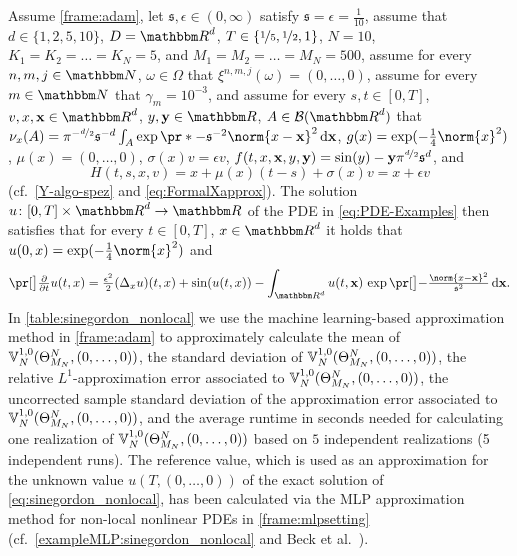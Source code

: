 Assume 
	\cref{frame:adam},
let
	$\mathfrak s,\epsilon\in(0,\infty)$
satisfy
	$\mathfrak{s} = \epsilon =\tfrac{1}{10}$,
assume that
	$d\in\{1,2,5,10\}$,
	$\D = \R^d$,
	$T\in\{\nicefrac{1}{5},\nicefrac{1}{2},1\}$,
	$N=10$,
	$K_1 = K_2 = \ldots = K_N= 5$, and
	$M_1 = M_2 = \ldots = M_N = 500$,
assume 
	for every 
		$n,m,j\in \N$, 
		$\omega \in \Omega$
	that 
		$\xi^{n,m,j}(\omega)=(0,\dots,0)$,
assume 
	for every 
		$m \in \N$
	that
		$\gamma_m = 10^{-3}$,
and assume 
	for every 
		$s,t \in [0,T]$, 
		$v,x,\mathbf{x}%
		\in \R^d$, 
		$y,\mathbf{y} \in \R$,
		$A \in \mathcal{B}(\R^d)$
	that
		$\nu_x(A) = \pi^{-\nicefrac{d}{2}}\mathfrak{s}^{-d}\int_A \exp\pr*{-\mathfrak{s}^{-2}\norm{x - \mathbf{x}}^2}\,\diff\mathbf{x}$,
		$g(x)= \exp (-\tfrac{1}{4}\norm{x}^2)$,
		$\mu(x)=(0,\dots,0)$,
		$\sigma(x) v = \epsilon v$, 
		$f(t,x,\mathbf{x},y,\mathbf{y}%
		)=  \sin(y) - \mathbf{y} \pi^{\nicefrac{d}{2}}\mathfrak{s}^d$, 
		and
	\begin{equation}
		\label{eq:Hsinegordon}
		H(t,s,x,v)
		=
		x + \mu(x)(t-s)+ \sigma(x)v
		=
		x+\epsilon v
	\end{equation}
	(cf.\ \eqref{Y-algo-spez} and \eqref{eq:FormalXapprox}).
The solution 
	$u\colon[0,T]\times \R^d \to \R$ 
	of the PDE in \eqref{eq:PDE-Examples} then satisfies that 
		for every
			$t\in [0,T]$, 
			$x\in\R^d$ 
		it holds that 
			$u(0,x)=\exp (-\tfrac{1}{4}\norm{x}^2)$ and
		\begin{equation}
			\label{eq:sinegordon_nonlocal}
			\bpr{\tfrac{\partial}{\partial t}u}(t,x)
			=
			\tfrac{\epsilon^2}{2}(\Delta_x u)(t,x) + \sin ( u(t,x) ) - \int_{\R^d} u(t,\mathbf{x})\, \exp\bpr{-\tfrac{\norm{x-\mathbf{x}}^2}{\mathfrak{s}^2}}\,\diff\mathbf{x} 
			.
		\end{equation}
%
%
In \cref{table:sinegordon_nonlocal} 
we use the machine learning-based approximation method
in \cref{frame:adam} 
to approximately calculate
the mean of %
$
{\mathbb{V}}^{1,0}_N(\Theta^N_{M_N},\allowbreak (0,\ldots,0))
$,
the standard deviation of %
$
{\mathbb{V}}^{1,0}_N(\Theta^N_{M_N},\allowbreak (0,\ldots,0))
$,
the relative $ L^1 $-approximation error associated to %
$
{\mathbb{V}}^{1,0}_N(\Theta^N_{M_N},\allowbreak (0,\ldots,\allowbreak 0))
$,
the uncorrected sample standard deviation of the approximation error associated to %
$
{\mathbb{V}}^{1,0}_N(\Theta^N_{M_N},\allowbreak (0,\ldots,0))
$,
and the average runtime in seconds needed for calculating one realization of $
{\mathbb{V}}^{1,0}_N(\Theta^N_{M_N},\allowbreak (0,\ldots,0))
$
%
based on $5$ independent realizations (5 independent runs).
%
The reference value, which is used as an approximation for the unknown value $u(T,(0,\ldots,0))$ of the exact solution of \eqref{eq:sinegordon_nonlocal},  has been calculated via the MLP approximation method for non-local nonlinear PDEs in \cref{frame:mlpsetting} (cf.~\cref{exampleMLP:sinegordon_nonlocal} and Beck et al.~\cite[Remark~3.3]{Beck2017a}).


